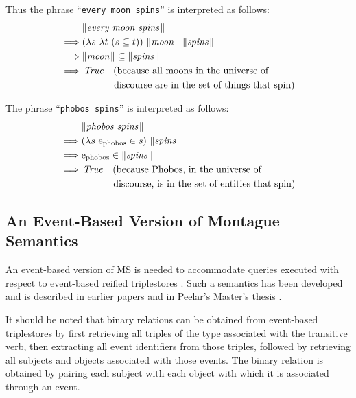 \documentclass[../main.tex]{subfiles}
\begin{document}
\begin{refsection}
Thus the phrase ``\texttt{every moon spins}'' is interpreted as follows:
\begin{equation*}
	\begin{split}
		&\meaningof{every moon spins}\\
		\implies& (\lambda s \ \lambda t \ (s \subseteq t)) \ \meaningof{moon} \ \meaningof{spins} \\
		\implies& \meaningof{moon}  \subseteq  \meaningof{spins} \\
		\implies& \True \quad (\dmathrm{because all moons in the universe of} \\
		&\dmathrm{\quad\qquad\ discourse are in the set of things that spin}) \\
	\end{split}
\end{equation*}

The phrase ``\texttt{phobos spins}'' is interpreted as follows:
\begin{equation*}
	\begin{split}
		&\meaningof{phobos spins}\\
		\implies& (\lambda s \ \entityassoc{\phobos} \in s) \ \meaningof{spins}\\
		\implies& \entityassoc{\phobos} \in  \meaningof{spins} \\
		\implies& \True \quad (\dmathrm{because Phobos, in the universe of} \\
		&\dmathrm{\quad\qquad\ discourse, is in the set of entities that spin})
	\end{split}
\end{equation*}
\subsection{An Event-Based Version of Montague Semantics}
\label{icsc2020conf:evflms}
An event-based version of MS is needed to accommodate queries executed with respect to event-based reified triplestores \cite{graphmqslide}. Such a semantics has been developed and is described in
earlier papers \cite{graphmqslide, frost2014demonstration} and in Peelar's Master's thesis \cite{peelar2016accommodating}.

It should be noted that binary relations can be obtained from event-based triplestores by first retrieving
all triples of the type associated with the transitive verb, then extracting all event identifiers from those
triples, followed by retrieving all subjects and objects associated with those events. The binary relation
is obtained by pairing each subject with each object with which it is associated through an event.


\end{refsection}
\end{document}
